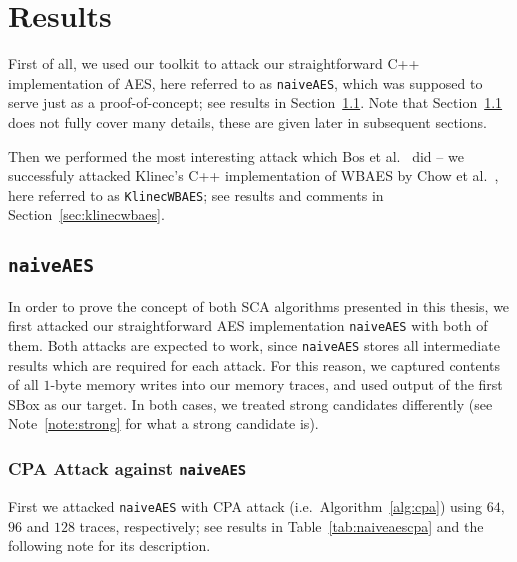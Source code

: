 \section{Results}
\label{sec:results}

First of all, we used our toolkit to attack our straightforward C++ implementation of AES, here referred to as {\tt naiveAES}, which was supposed to serve just as a proof-of-concept; see results in Section~\ref{sec:naiveaes}. Note that Section~\ref{sec:naiveaes} does not fully cover many details, these are given later in subsequent sections.

Then we performed the most interesting attack which Bos et al.\ \cite{bos2015differential} did -- we successfuly attacked Klinec's C++ implementation \cite{klinec2013implementation} of WBAES by Chow et al.\ \cite{chow2002aes}, here referred to as {\tt KlinecWBAES}; see results and comments in Section~\ref{sec:klinecwbaes}.



\subsection{\tt naiveAES}
\label{sec:naiveaes}

In order to prove the concept of both SCA algorithms presented in this thesis, we first attacked our straightforward AES implementation {\tt naiveAES} with both of them. Both attacks are expected to work, since {\tt naiveAES} stores all intermediate results which are required for each attack. For this reason, we captured contents of all $1$-byte memory writes into our memory traces, and used output of the first SBox as our target. In both cases, we treated strong candidates differently (see Note~\ref{note:strong} for what a strong candidate is).

\subsubsection{CPA Attack against {\tt naiveAES}}
	
	First we attacked {\tt naiveAES} with CPA attack (i.e.\ Algorithm~\ref{alg:cpa}) using $64$, $96$ and $128$ traces, respectively; see results in Table~\ref{tab:naiveaescpa} and the following note for its description.
	
